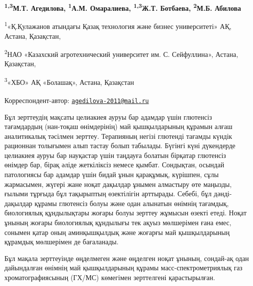 
\begin{articleheader}


{\bfseries \textsuperscript{1,3}М.Т. Агедилова\textsuperscript{\envelope },
\textsuperscript{1}А.М. Омаралиева, \textsuperscript{1,3}Ж.Т. Ботбаева,
\textsuperscript{2}М.Б. Абилова}
\end{articleheader}
\begin{affiliation}

\textsuperscript{1}«Қ.Қулажанов атындағы Қазақ технология және бизнес
университеті» АҚ, Астана, Қазақстан,

\textsuperscript{2}НАО «Казахский агротехнический университет им. С.
Сейфуллина», Астана, Қазақстан,

\textsuperscript{3}«ХБО» АҚ «Болашақ», Астана, Қазақстан


\raggedright{\bfseries \textsuperscript{\envelope }}Корреспондент-автор:
\href{mailto:agedilova-2011@mail.ru}{\nolinkurl{agedilova-2011@mail.ru}}

\end{affiliation}

Бұл зерттеудің мақсаты целиакиея ауруы бар адамдар үшін глютенсіз
тағамдардың (нан-тоқаш өнімдерінің) май қышқылдарының құрамын алғаш
аналитикалық тәсілмен зерттеу. Терапияның негізі глютенді тағамды күндік
рационнан толығымен алып тастау болып табылады. Бүгінгі күні дүкендерде
целиакиея ауруы бар науқастар үшін таңдауға болатын бірқатар глютенсіз
өнімдер бар, бірақ әліде жеткіліксіз немесе қымбат. Сондықтан, осындай
патологиясы бар адамдар үшін бидай ұнын қарақұмық, күрішпен, сұлы
жармасымен, жүгері жане ноқат дақылдар ұнымен алмастыру өте маңызды,
ғылыми тұрғыда бұл тақырыптың өзектілігін арттырады. Себебі, бұл дәнді-
дақылдар құрамы глютенсіз болуы және одан алынатын өнімнің тағамдық,
биологиялық құндылықтары жоғары болуы зерттеу жұмысын өзекті етеді.
Ноқат ұнының жоғары биологиялық құндылығы тек ақуыз мөлшерімен ғана
емес, сонымен қатар оның аминқышқылдық және жоғарғы май қышқылдарының
құрамдық мөлшерімен де бағаланады.

Бұл мақала зерттеуінде өңделмеген және өңделген ноқат ұнының, сондай-ақ
одан дайындалған өнімнің май қышқылдарының құрамы масс-спектрометриялық
газ хроматографиясының (ГХ/МС) көмегімен зерттелгені қарастырылған.

